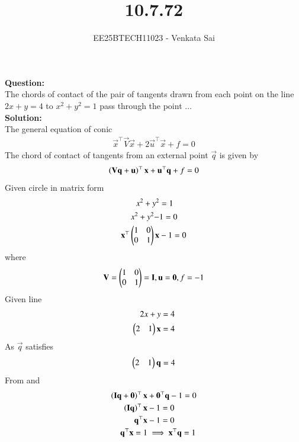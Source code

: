 \documentclass[journal]{IEEEtran}
\begin{document}


\title{10.7.72}
\author{EE25BTECH11023 - Venkata Sai}
\maketitle 
\renewcommand{\thefigure}{\theenumi}
\renewcommand{\thetable}{\theenumi}
\setlength{\intextsep}{10pt} %

\renewcommand{\thetable}{\theenumi}

\textbf{Question:}  \\
The chords of contact of the pair of tangents drawn from each point on the line
$2x + y = 4$ to $x^2 + y^2 = 1 $ pass through the point $\dots$\\
\textbf{Solution:}  \\
The general equation of conic
\begin{align}
    \vec{x}^\top\vec{V}\vec{x} + 2\vec{u}^\top\vec{x} + f = 0
\end{align}
The chord of contact of tangents from an external point $\vec{q}$ is given by
\begin{align}
 \left(\mathbf{V}\mathbf{q}+\mathbf{u}\right)^\top\mathbf{x}+\mathbf{u}^\top\mathbf{q}+f=0
\end{align}
Given circle in matrix form
\begin{align}
x^2 + y^2 &= 1  \\
x^2 + y^2 - &1=0 \\
\mathbf{x}^\top\begin{pmatrix}1 &0 \\0 &1\end{pmatrix}\mathbf{x}&-1=0
\end{align}
where
\begin{align}
\mathbf{V}=\begin{pmatrix}1&0\\0&1\end{pmatrix}=\mathbf{I},\mathbf{u}=\mathbf{0},f=-1
\end{align}
Given line 
\begin{align}
2x + y = 4 \\ 
\begin{pmatrix}2&1\end{pmatrix}\mathbf{x}=4
\end{align}
As $\vec{q}$ satisfies 
\begin{align}
   \begin{pmatrix}2&1\end{pmatrix}\mathbf{q}=4 
\end{align}
From  and 
\begin{align}
  \left(\mathbf{I}\mathbf{q}+\mathbf{0}\right)^\top\mathbf{x}&+\mathbf{0}^\top\mathbf{q}-1=0 \\
  \left(\mathbf{I}\mathbf{q}\right)^\top\mathbf{x}&-1=0\\
  \mathbf{q}^\top\mathbf{x}&-1=0\\
  \mathbf{q}^\top\mathbf{x}=1&\implies
  \mathbf{x}^\top\mathbf{q}=1 
  \end{align}
\end{document}
